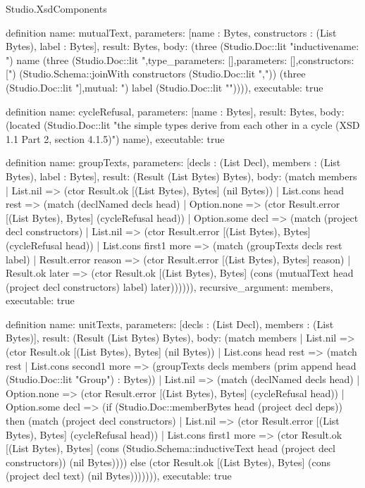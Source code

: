 \begin{lexlean}{Studio.XsdComponents}
\begin{semanticmodule}
definition{
  name: mutualText,
  parameters: [name : Bytes, constructors : (List Bytes), label : Bytes],
  result: Bytes,
  body: (three (Studio.Doc::lit "inductive{\n  name: ") name (three (Studio.Doc::lit ",\n  type_parameters: [],\n  parameters: [],\n  constructors: [\n") (Studio.Schema::joinWith constructors (Studio.Doc::lit ",\n")) (three (Studio.Doc::lit "\n  ],\n  mutual: ") label (Studio.Doc::lit "\n}\n")))),
  executable: true
}

definition{
  name: cycleRefusal,
  parameters: [name : Bytes],
  result: Bytes,
  body: (located (Studio.Doc::lit "the simple types derive from each other in a cycle (XSD 1.1 Part 2, section 4.1.5)") name),
  executable: true
}

definition{
  name: groupTexts,
  parameters: [decls : (List Decl), members : (List Bytes), label : Bytes],
  result: (Result (List Bytes) Bytes),
  body: (match members
    | List.nil => (ctor Result.ok [(List Bytes), Bytes] (nil Bytes))
    | List.cons head rest => (match (declNamed decls head)
      | Option.none => (ctor Result.error [(List Bytes), Bytes] (cycleRefusal head))
      | Option.some decl => (match (project decl constructors)
        | List.nil => (ctor Result.error [(List Bytes), Bytes] (cycleRefusal head))
        | List.cons first1 more => (match (groupTexts decls rest label)
          | Result.error reason => (ctor Result.error [(List Bytes), Bytes] reason)
          | Result.ok later => (ctor Result.ok [(List Bytes), Bytes] (cons (mutualText head (project decl constructors) label) later)))))),
  recursive_argument: members,
  executable: true
}

definition{
  name: unitTexts,
  parameters: [decls : (List Decl), members : (List Bytes)],
  result: (Result (List Bytes) Bytes),
  body: (match members
    | List.nil => (ctor Result.ok [(List Bytes), Bytes] (nil Bytes))
    | List.cons head rest => (match rest
      | List.cons second1 more => (groupTexts decls members (prim append head (Studio.Doc::lit "Group") : Bytes))
      | List.nil => (match (declNamed decls head)
        | Option.none => (ctor Result.error [(List Bytes), Bytes] (cycleRefusal head))
        | Option.some decl => (if (Studio.Doc::memberBytes head (project decl deps)) then (match (project decl constructors)
          | List.nil => (ctor Result.error [(List Bytes), Bytes] (cycleRefusal head))
          | List.cons first1 more => (ctor Result.ok [(List Bytes), Bytes] (cons (Studio.Schema::inductiveText head (project decl constructors)) (nil Bytes)))) else (ctor Result.ok [(List Bytes), Bytes] (cons (project decl text) (nil Bytes))))))),
  executable: true
}


\end{semanticmodule}
\end{lexlean}
